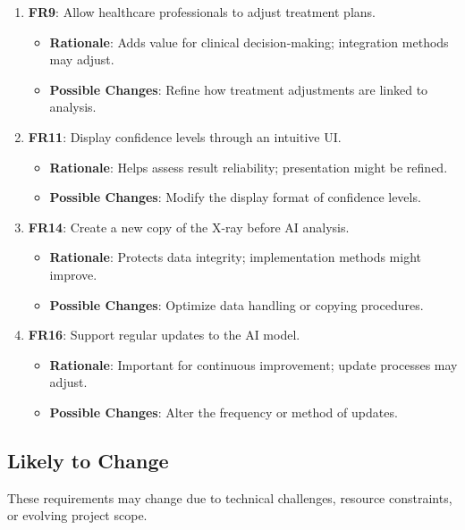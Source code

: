 \documentclass[12pt]{article}
\begin{document}
\begin{enumerate}[resume]
    \item \textbf{FR9}: Allow healthcare professionals to adjust treatment plans.
    \begin{itemize}[label=-]
        \item \textbf{Rationale}: Adds value for clinical decision-making; integration methods may adjust.
        \item \textbf{Possible Changes}: Refine how treatment adjustments are linked to analysis.
    \end{itemize}

    \item \textbf{FR11}: Display confidence levels through an intuitive UI.
    \begin{itemize}[label=-]
        \item \textbf{Rationale}: Helps assess result reliability; presentation might be refined.
        \item \textbf{Possible Changes}: Modify the display format of confidence levels.
    \end{itemize}

    \item \textbf{FR14}: Create a new copy of the X-ray before AI analysis.
    \begin{itemize}[label=-]
        \item \textbf{Rationale}: Protects data integrity; implementation methods might improve.
        \item \textbf{Possible Changes}: Optimize data handling or copying procedures.
    \end{itemize}

    \item \textbf{FR16}: Support regular updates to the AI model.
    \begin{itemize}[label=-]
        \item \textbf{Rationale}: Important for continuous improvement; update processes may adjust.
        \item \textbf{Possible Changes}: Alter the frequency or method of updates.
    \end{itemize}
\end{enumerate}

\subsection{Likely to Change}

These requirements may change due to technical challenges, resource constraints, or evolving project scope.
\end{document}
